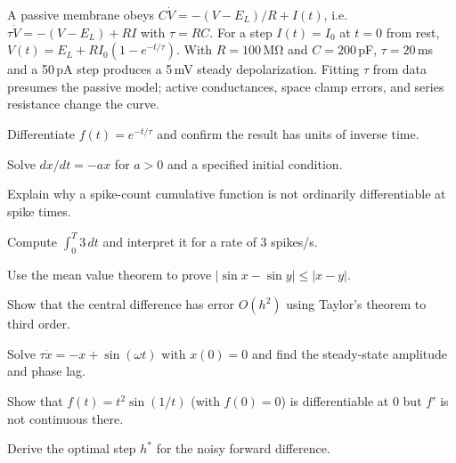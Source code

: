 \begin{workedexample}
A passive membrane obeys $C\dot V=-(V-E_L)/R+I(t)$, i.e.\ $\tau\dot V=-(V-E_L)+RI$ with $\tau=RC$. For a step $I(t)=I_0$ at $t=0$ from rest, $V(t)=E_L+RI_0(1-e^{-t/\tau})$. With $R=100\,\mathrm{M\Omega}$ and $C=200$\,pF, $\tau=20$\,ms and a 50\,pA step produces a 5\,mV steady depolarization. Fitting $\tau$ from data presumes the passive model; active conductances, space clamp errors, and series resistance change the curve.
\end{workedexample}
\begin{exercises}
\item Differentiate $f(t)=e^{-t/\tau}$ and confirm the result has units of inverse time.
\item Solve $dx/dt=-ax$ for $a>0$ and a specified initial condition.
\item Explain why a spike-count cumulative function is not ordinarily differentiable at spike times.
\item Compute $\int_0^T 3\,dt$ and interpret it for a rate of 3 spikes/s.
\item Use the mean value theorem to prove $|\sin x-\sin y|\le|x-y|$.
\item Show that the central difference has error $O(h^2)$ using Taylor's theorem to third order.
\item Solve $\tau\dot x=-x+\sin(\omega t)$ with $x(0)=0$ and find the steady-state amplitude and phase lag.
\item Show that $f(t)=t^2\sin(1/t)$ (with $f(0)=0$) is differentiable at $0$ but $f'$ is not continuous there.
\item Derive the optimal step $h^\ast$ for the noisy forward difference.
\end{exercises}
